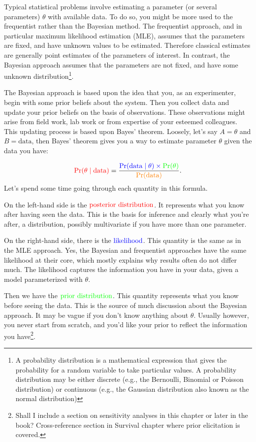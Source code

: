\documentclass[
  12pt,
]{krantz}
\begin{document}
Typical statistical problems involve estimating a parameter (or several parameters) \(\theta\) with available data. To do so, you might be more used to the frequentist rather than the Bayesian method. The frequentist approach, and in particular maximum likelihood estimation (MLE), assumes that the parameters are fixed, and have unknown values to be estimated. Therefore classical estimates are generally point estimates of the parameters of interest. In contrast, the Bayesian approach assumes that the parameters are not fixed, and have some unknown distribution\footnote{A probability distribution is a mathematical expression that gives the probability for a random variable to take particular values. A probability distribution may be either discrete (e.g., the Bernoulli, Binomial or Poisson distribution) or continuous (e.g., the Gaussian distribution also known as the normal distribution)}.

The Bayesian approach is based upon the idea that you, as an experimenter, begin with some prior beliefs about the system. Then you collect data and update your prior beliefs on the basis of observations. These observations might arise from field work, lab work or from expertise of your esteemed colleagues. This updating process is based upon Bayes' theorem. Loosely, let's say \(A = \theta\) and \(B = \text{data}\), then Bayes' theorem gives you a way to estimate parameter \(\theta\) given the data you have:

\[{\color{red}{\Pr(\theta \mid \text{data})}} = \frac{\color{blue}{\Pr(\text{data} \mid \theta)} \times \color{green}{\Pr(\theta)}}{\color{orange}{\Pr(\text{data})}}.\]
Let's spend some time going through each quantity in this formula.

On the left-hand side is the \(\color{red}{\text{posterior distribution}}\). It represents what you know after having seen the data. This is the basis for inference and clearly what you're after, a distribution, possibly multivariate if you have more than one parameter.

On the right-hand side, there is the \(\color{blue}{\text{likelihood}}\). This quantity is the same as in the MLE approach. Yes, the Bayesian and frequentist approaches have the same likelihood at their core, which mostly explains why results often do not differ much. The likelihood captures the information you have in your data, given a model parameterized with \(\theta\).

Then we have the \(\color{green}{\text{prior distribution}}\). This quantity represents what you know before seeing the data. This is the source of much discussion about the Bayesian approach. It may be vague if you don't know anything about \(\theta\). Usually however, you never start from scratch, and you'd like your prior to reflect the information you have\footnote{Shall I include a section on sensitivity analyses in this chapter or later in the book? Cross-reference section in Survival chapter where prior elicitation is covered.}.
\end{document}
